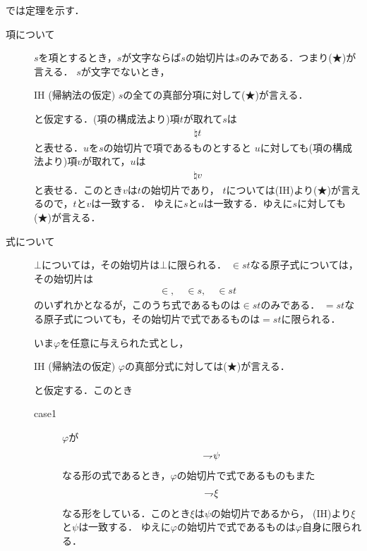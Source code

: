 	では定理を示す．
	
	\begin{metaprf}\mbox{}
		\begin{description}
			\item[項について]
				$s$を項とするとき，$s$が文字ならば$s$の始切片は$s$のみである．つまり(★)が言える．
				$s$が文字でないとき，
				\begin{itembox}[l]{IH (帰納法の仮定)}
					$s$の全ての真部分項に対して(★)が言える．
				\end{itembox}
				と仮定する．(項の構成法より)項$t$が取れて$s$は
				\begin{align}
					\natural t
				\end{align}
				と表せる．$u$を$s$の始切片で項であるものとすると
				$u$に対しても(項の構成法より)項$v$が取れて，$u$は
				\begin{align}
					\natural v
				\end{align}
				と表せる．このとき$v$は$t$の始切片であり，
				$t$については(IH)より(★)が言えるので，$t$と$v$は一致する．
				ゆえに$s$と$u$は一致する．ゆえに$s$に対しても(★)が言える．
				
			\item[式について]
				$\bot$については，その始切片は$\bot$に限られる．
				$\in st$なる原子式については，その始切片は
				\begin{align}
					\in, \quad \in s, \quad \in st
				\end{align}
				のいずれかとなるが，このうち式であるものは$\in st$のみである．
				$=st$なる原子式についても，その始切片で式であるものは$=st$に限られる．
	
				いま$\varphi$を任意に与えられた式とし，
				\begin{itembox}[l]{IH (帰納法の仮定)}
					$\varphi$の真部分式に対しては(★)が言える．
				\end{itembox}
				と仮定する．このとき
				\begin{description}
					\item[case1] $\varphi$が
						\begin{align}
							\rightharpoondown\hspace{-0.25em} \psi
						\end{align}
						なる形の式であるとき，$\varphi$の始切片で式であるものもまた
						\begin{align}
							\rightharpoondown\hspace{-0.25em} \xi
						\end{align}
						なる形をしている．このとき$\xi$は$\psi$の始切片であるから，
						(IH)より$\xi$と$\psi$は一致する．
						ゆえに$\varphi$の始切片で式であるものは$\varphi$自身に限られる．
			

\end{description}
\end{description}
\end{metaprf}
